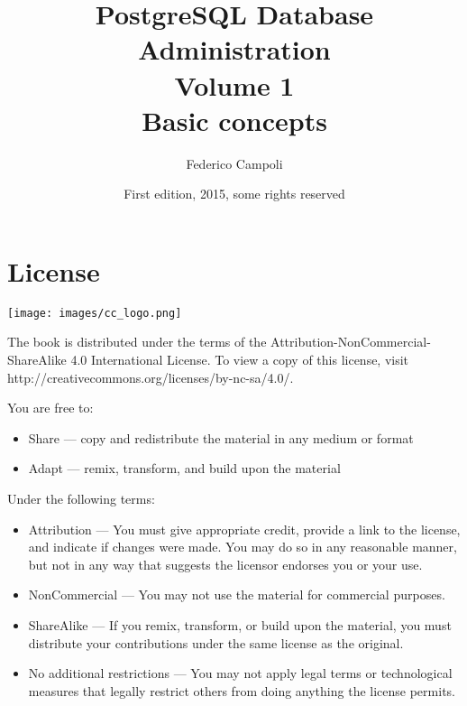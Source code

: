 \documentclass[oneside]{book}
\author{Federico Campoli}
\title{PostgreSQL Database Administration \\ Volume 1 \\ Basic concepts}
\date{First edition, 2015, some rights reserved}
\begin{document}

\maketitle



\chapter*{License}
\begin{center}
    \texttt{[image: images/cc\_logo.png]}
\end{center}

The book is distributed under the terms of the Attribution-NonCommercial-ShareAlike 4.0 International
License. To view a copy of this license, visit http://creativecommons.org/licenses/by-nc-sa/4.0/.\newline


You are free to:
\begin{itemize}

    \item     Share — copy and redistribute the material in any medium or format
    \item     Adapt — remix, transform, and build upon the material

\end{itemize}


Under the following terms:
\begin{itemize}
    \item    Attribution — You must give appropriate credit, provide a link to the license, and indicate if
        changes were made. You may do so in any reasonable manner, but not in any way that suggests the licensor
        endorses you or your use.

    \item    NonCommercial — You may not use the material for commercial purposes.

    \item    ShareAlike — If you remix, transform, or build upon the material, you must distribute your
        contributions under the same license as the original.

    \item    No additional restrictions — You may not apply legal terms or technological measures that legally
        restrict others from doing anything the license permits.

\end{itemize}
\end{document}
